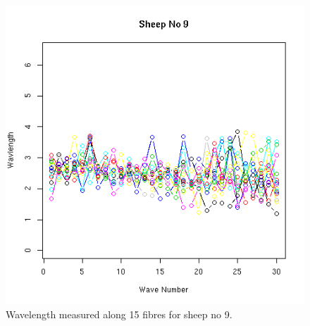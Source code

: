 %

\begin{figure}[!h]
  \centering
  \includegraphics[width=1.0\textwidth]{figsfwavl.png}
  \caption{Wavelength measured along 15 fibres for sheep no 9.}
  \label{fig:sfwavl}
\end{figure}

%

